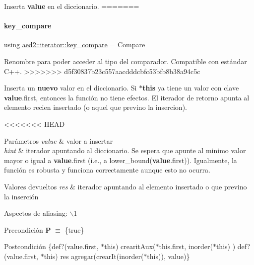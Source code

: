 \-Inserta {\bfseries value} en el diccionario. 
=======
\mbox{\label{classaed2_1_1iterator_a958d31cebad5df42b144eb6da2d44764_a958d31cebad5df42b144eb6da2d44764}} 
\paragraph{\texorpdfstring{key\+\_\+compare}{key\_compare}}
{\footnotesize\ttfamily using \hyperlink{classaed2_1_1iterator_a958d31cebad5df42b144eb6da2d44764_a958d31cebad5df42b144eb6da2d44764}{aed2\+::iterator\+::key\+\_\+compare} =  Compare}



Renombre para poder acceder al tipo del comparador. Compatible con estándar C++. 
>>>>>>> d5f30837b23c557aacdddcbfc53bfb8b38a94c5c

\-Inserta un {\bfseries nuevo} valor en el diccionario. \-Si {\bfseries $\ast$this} ya tiene un valor con clave {\bfseries value}.first, entonces la función no tiene efectos. \-El iterador de retorno apunta al elemento recien insertado (o aquel que previno la insercion).

<<<<<<< HEAD

\begin{DoxyParams}{\-Parámetros}
{\em value} & valor a insertar \\
\hline
{\em hint} & iterador apuntando al diccionario. \-Se espera que apunte al minimo valor mayor o igual a {\bfseries value}.first (i.\-e., a lower\-\_\-bound({\bfseries value}.first)). \-Igualmente, la función es robusta y funciona correctamente aunque esto no ocurra. \\
\hline
\end{DoxyParams}

\begin{DoxyRetVals}{\-Valores devueltos}
{\em res} & iterador apuntando al elemento insertado o que previno la inserción\\
\hline
\end{DoxyRetVals}
\begin{DoxyParagraph}{\-Aspectos de aliasing\-:}
$\backslash$1
\end{DoxyParagraph}
\begin{DoxyPrecond}{\-Precondición}
{\bfseries \-P} $\equiv$ \{true\} 
\end{DoxyPrecond}
\begin{DoxyPostcond}{\-Postcondición}
\{def?(value.\-first, $\ast$this)  crearit\-Aux($\ast$this.first, inorder($\ast$this) )   def?(value.\-first, $\ast$this)  res  agregar(crear\-It(inorder($\ast$this)), value)\}
\end{DoxyPostcond}

